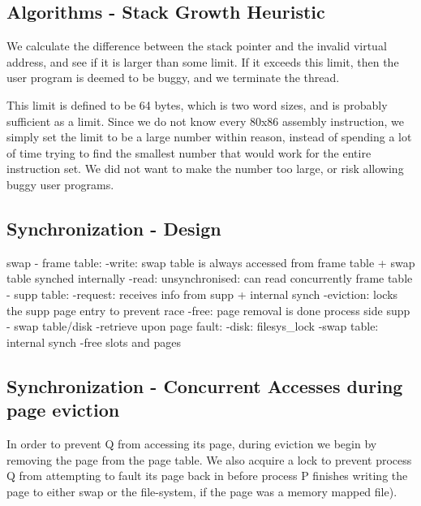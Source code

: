 \subsection{Algorithms - Stack Growth Heuristic}


We calculate the difference between the stack pointer and the invalid virtual
address, and see if it is larger than some limit. If it exceeds this limit, then
the user program is deemed to be buggy, and we terminate the thread.

This limit is defined to be 64 bytes, which is two word sizes, and is probably
sufficient as a limit.  Since we do not know every 80x86 assembly instruction,
we simply set the limit to be a large number within reason, instead of spending
a lot of time trying to find the smallest number that would work for the entire
instruction set. We did not want to make the number too large, or risk allowing
buggy user programs.

\subsection{Synchronization - Design}

swap - frame table:
  -write: swap table is always accessed from frame table + swap table synched internally
  -read: unsynchronised: can read concurrently %
frame table - supp table:
  -request: receives info from supp + internal synch
  -eviction: locks the supp page entry to prevent race
  -free: page removal is done process side
supp - swap table/disk
  -retrieve upon page fault:
    -disk: filesys\_lock
    -swap table: internal synch
  -free slots and pages

\subsection{Synchronization - Concurrent Accesses during page eviction}

In order to prevent Q from accessing its page, during eviction we begin by removing the page from the page table.
We also acquire a lock to prevent process Q from attempting to fault its page back in before process P finishes writing the page to either swap or the file-system, if the page was a memory mapped file).


